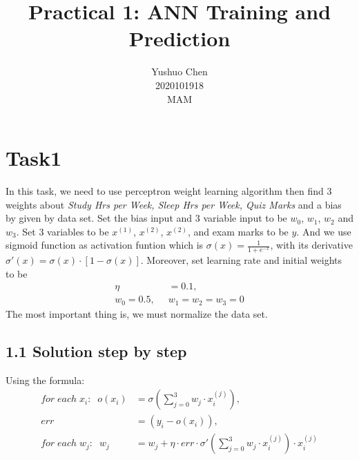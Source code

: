 \documentclass{article}
\begin{document}
\title{\textbf{Practical 1: ANN Training and Prediction}}
\author{Yushuo Chen\\2020101918\\MAM}
\maketitle

\section*{Task1}
In this task, we need to use perceptron weight learning algorithm then find 3 weights about 
\emph{Study Hrs per Week, Sleep Hrs per Week, Quiz Marks} and a bias by given by data set.
Set the bias input and 3 variable input to be $w_0$, $w_1$, $w_2$ and $w_3$.
Set 3 variables to be $x^{(1)}$, $x^{(2)}$, $x^{(2)}$, and exam marks to be $y$.
And we use sigmoid function as activation funtion which is $\sigma(x)=\frac{1}{1+e^{-x}}$,
with its derivative $\sigma'(x)=\sigma(x)\cdot [1-\sigma(x)]$.
Moreover, set learning rate and initial weights to be 
\begin{align*}
    \eta &= 0.1,\\
    w_0=0.5,\;\; &w_1=w_2=w_3=0
\end{align*}
The most important thing is, we must normalize the data set.

\subsection*{1.1 Solution step by step}
Using the formula:
\begin{align*}
    for\;each\; x_i:\;\; o(x_i)&=\sigma(\sum_{j=0}^3 w_j \cdot x_i^{(j)}),\\
    err&=(y_i-o(x_i)),\\
    for\; each\; w_j:\;\; w_j&=w_j+\eta \cdot err \cdot \sigma'(\sum_{j=0}^3 w_j \cdot x_i^{(j)}) \cdot x_i^{(j)}
\end{align*}
\end{document}
